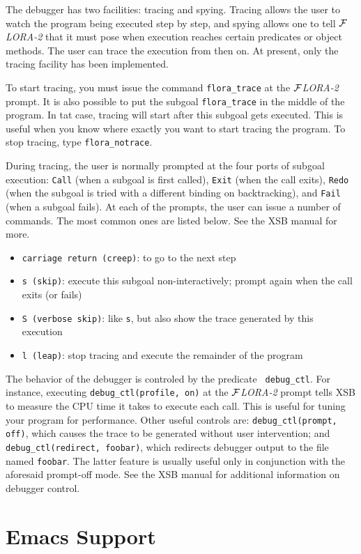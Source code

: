 \documentclass[11pt]{article}
\newcommand{\FLORA}{{\mbox{${\cal F}${\small\it LORA}\rm\emph{-2}}}\xspace}
\begin{document}
The debugger has two facilities: tracing and spying. Tracing allows the
user to watch the program being executed step by step, and spying allows
one to tell \FLORA that it must pose when execution reaches certain 
predicates or object methods. The user can trace the execution from then
on. At present, only the tracing facility has been implemented.

To start tracing, you must issue the command {\tt flora\_trace} at the
\FLORA prompt. It is also possible to put the subgoal {\tt flora\_trace} in
the middle of the program. In tat case, tracing will start after this
subgoal gets executed. This is useful when you know where exactly you want
to start tracing the program. To stop tracing, type {\tt flora\_notrace}.

During tracing, the user is normally prompted at the four ports of subgoal
execution: {\tt Call} (when a subgoal is first called), {\tt Exit} (when
the call exits), {\tt Redo} (when the subgoal is tried with a different
binding on backtracking), and {\tt Fail} (when a subgoal fails).
At each of the prompts, the user can issue a number of commands. The most
common ones are listed below. See the XSB manual for more.
\begin{itemize}
  \item {\tt carriage return (creep)}:  to go to the next step  
  \item {\tt s (skip)}: execute this subgoal non-interactively; prompt
    again when the call exits (or fails)
  \item {\tt S (verbose skip)}: like {\tt s}, but also show the trace
    generated by this execution
  \item {\tt l (leap)}: stop tracing and execute the remainder of the
    program
\end{itemize}
The behavior of the debugger is controled by the predicate {\tt
  debug\_ctl}. For instance, executing {\tt debug\_ctl(profile, on)} at the
\FLORA prompt tells XSB to measure the CPU time it takes to execute each
call. This is useful for tuning your program for performance. Other useful
controls are: {\tt debug\_ctl(prompt, off)}, which causes the trace to be
generated without user intervention; and {\tt debug\_ctl(redirect,
  foobar)}, which redirects debugger output to the file named {\tt foobar}.
The latter feature is usually useful only in conjunction with the
  aforesaid prompt-off mode. See the XSB manual for additional information
  on debugger control.


\section{Emacs Support}
\end{document}
